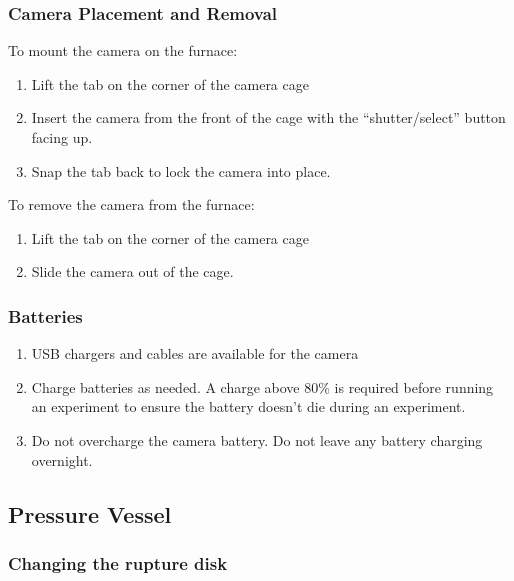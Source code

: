 \hypertarget{camera-placement-and-removal}{%
\subsubsection{Camera Placement and
Removal}\label{camera-placement-and-removal}}

To mount the camera on the furnace:

\begin{enumerate}
\def\labelenumi{\arabic{enumi}.}
\tightlist
\item
  Lift the tab on the corner of the camera cage
\item
  Insert the camera from the front of the cage with the
  ``shutter/select'' button facing up.
\item
  Snap the tab back to lock the camera into place.
\end{enumerate}

To remove the camera from the furnace:

\begin{enumerate}
\def\labelenumi{\arabic{enumi}.}
\tightlist
\item
  Lift the tab on the corner of the camera cage
\item
  Slide the camera out of the cage.
\end{enumerate}

\hypertarget{batteries}{%
\subsubsection{Batteries}\label{batteries}}

\begin{enumerate}
\def\labelenumi{\arabic{enumi}.}
\tightlist
\item
  USB chargers and cables are available for the camera
\item
  Charge batteries as needed. A charge above 80\% is required before
  running an experiment to ensure the battery doesn't die during an
  experiment.
\item
  Do not overcharge the camera battery. Do not leave any battery
  charging overnight.
\end{enumerate}

\hypertarget{pressure-vessel}{%
\subsection{Pressure Vessel}\label{pressure-vessel}}

\hypertarget{changing-the-rupture-disk}{%
\subsubsection{Changing the rupture
disk}\label{changing-the-rupture-disk}}

